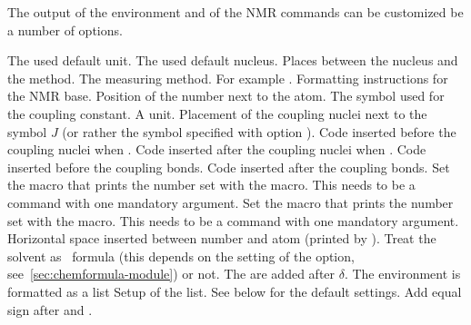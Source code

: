 \documentclass{chemmacros-manual}
\begin{document}
The output of the environment and of the NMR commands can be customized be a
number of options.  
\begin{options}
    The used default unit.
    The used default nucleus.
  \Default{-}
    Places  between the nucleus and the method.
    The measuring method.
  \Default
    For example .
  \Default
    Formatting instructions for the NMR base.
    Position of the number next to the atom.
    The symbol used for the coupling constant.
    A  unit.
    Placement of the coupling nuclei next to the symbol $J$ (or rather the
    symbol specified with option ).
  \Default{(}
    Code inserted before the coupling nuclei when .
  \Default{)}
    Code inserted after the coupling nuclei when .
  \Default
    Code inserted before the coupling bonds.
  \Default{\cs*{!}}
    Code inserted after the coupling bonds.
    Set the macro that prints the number set with the  macro.  This
    needs to be a command with one mandatory argument.
    Set the macro that prints the number set with the \cs{\#} macro.  This
    needs to be a command with one mandatory argument.
  \Default{.16667em}
    Horizontal space inserted between number and atom
    (printed by \cs{\#}).
    Treat the solvent as \chemformula\ formula (this depends on the setting of
    the  option, see~\vref{sec:chemformula-module}) or not.
  \Default
    The  are added after $\delta$.
    The environment  is formatted as a list
    Setup of the list. See below for the default settings.
    Add equal sign after  and .
\end{options}
\end{document}
